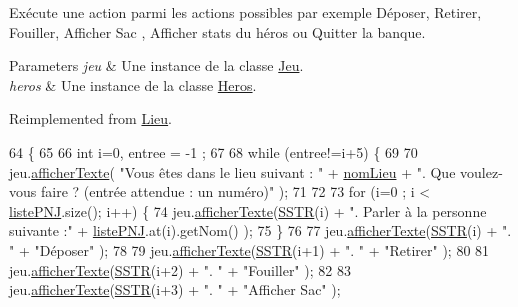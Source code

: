 Exécute une action parmi les actions possibles par exemple Déposer, Retirer, Fouiller, Afficher Sac , Afficher stats du héros ou Quitter la banque. 


\begin{DoxyParams}{Parameters}
{\em jeu} & Une instance de la classe \hyperlink{class_jeu}{Jeu}. \\
\hline
{\em heros} & Une instance de la classe \hyperlink{class_heros}{Heros}. \\
\hline
\end{DoxyParams}


Reimplemented from \hyperlink{class_lieu_ad5d4e14283df04f0174f090f1614225c}{Lieu}.


\begin{DoxyCode}
64                                                                    \{
65 
66         \textcolor{keywordtype}{int} i=0, entree = -1 ;
67 
68     \textcolor{keywordflow}{while} (entree!=i+5) \{
69 
70         jeu.\hyperlink{class_jeu_aa09fb40439f16b9665a0d76679f78e4e}{afficherTexte}( \textcolor{stringliteral}{"Vous êtes dans le lieu suivant : "} + 
      \hyperlink{class_lieu_a1e48889fe5c581f043b8bd77ca497fc7}{nomLieu} + \textcolor{stringliteral}{". Que voulez-vous faire ? (entrée attendue : un numéro)"} );
71 
72 
73         \textcolor{keywordflow}{for} (i=0 ; i < \hyperlink{class_lieu_a8c1e20b105f7972f22d8f16651de4ebd}{listePNJ}.size(); i++) \{
74             jeu.\hyperlink{class_jeu_aa09fb40439f16b9665a0d76679f78e4e}{afficherTexte}(\hyperlink{banque_8cpp_a0d2f37137ee1fd6ff4a0ef803849dd63}{SSTR}(i) + \textcolor{stringliteral}{". Parler à la personne suivante :"} + 
      \hyperlink{class_lieu_a8c1e20b105f7972f22d8f16651de4ebd}{listePNJ}.at(i).getNom() );
75         \}
76 
77         jeu.\hyperlink{class_jeu_aa09fb40439f16b9665a0d76679f78e4e}{afficherTexte}(\hyperlink{banque_8cpp_a0d2f37137ee1fd6ff4a0ef803849dd63}{SSTR}(i) + \textcolor{stringliteral}{". "} + \textcolor{stringliteral}{"Déposer"} );
78 
79         jeu.\hyperlink{class_jeu_aa09fb40439f16b9665a0d76679f78e4e}{afficherTexte}(\hyperlink{banque_8cpp_a0d2f37137ee1fd6ff4a0ef803849dd63}{SSTR}(i+1) + \textcolor{stringliteral}{". "} + \textcolor{stringliteral}{"Retirer"} );
80 
81         jeu.\hyperlink{class_jeu_aa09fb40439f16b9665a0d76679f78e4e}{afficherTexte}(\hyperlink{banque_8cpp_a0d2f37137ee1fd6ff4a0ef803849dd63}{SSTR}(i+2) + \textcolor{stringliteral}{". "} + \textcolor{stringliteral}{"Fouiller"} );
82 
83         jeu.\hyperlink{class_jeu_aa09fb40439f16b9665a0d76679f78e4e}{afficherTexte}(\hyperlink{banque_8cpp_a0d2f37137ee1fd6ff4a0ef803849dd63}{SSTR}(i+3) + \textcolor{stringliteral}{". "} + \textcolor{stringliteral}{"Afficher Sac"} );

\end{DoxyCode}
